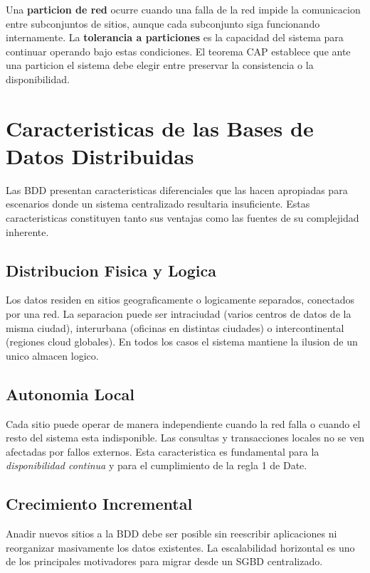 \documentclass[11pt,a4paper]{article}
\begin{document}
Una \textbf{particion de red} ocurre cuando una falla de la red impide la comunicacion entre subconjuntos de sitios, aunque cada subconjunto siga funcionando internamente. La \textbf{tolerancia a particiones} es la capacidad del sistema para continuar operando bajo estas condiciones. El teorema CAP establece que ante una particion el sistema debe elegir entre preservar la consistencia o la disponibilidad.

\section{Caracteristicas de las Bases de Datos Distribuidas}

Las BDD presentan caracteristicas diferenciales que las hacen apropiadas para escenarios donde un sistema centralizado resultaria insuficiente. Estas caracteristicas constituyen tanto sus ventajas como las fuentes de su complejidad inherente.

\subsection{Distribucion Fisica y Logica}

Los datos residen en sitios geograficamente o logicamente separados, conectados por una red. La separacion puede ser intraciudad (varios centros de datos de la misma ciudad), interurbana (oficinas en distintas ciudades) o intercontinental (regiones cloud globales). En todos los casos el sistema mantiene la ilusion de un unico almacen logico.

\subsection{Autonomia Local}

Cada sitio puede operar de manera independiente cuando la red falla o cuando el resto del sistema esta indisponible. Las consultas y transacciones locales no se ven afectadas por fallos externos. Esta caracteristica es fundamental para la \textit{disponibilidad continua} y para el cumplimiento de la regla 1 de Date.

\subsection{Crecimiento Incremental}

Anadir nuevos sitios a la BDD debe ser posible sin reescribir aplicaciones ni reorganizar masivamente los datos existentes. La escalabilidad horizontal es uno de los principales motivadores para migrar desde un SGBD centralizado.
\end{document}
